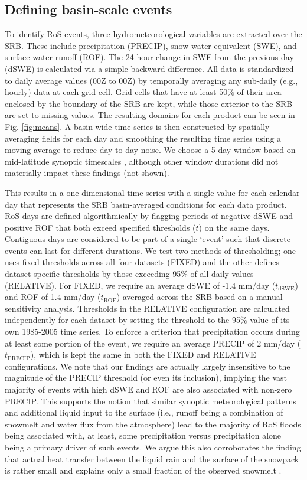 \documentclass[nhess, manuscript]{copernicus}
\begin{document}
\subsection{Defining basin-scale events}

To identify RoS events, three hydrometeorological variables are extracted over the SRB.
These include precipitation (PRECIP), snow water equivalent (SWE), and surface water runoff (ROF).
The 24-hour change in SWE from the previous day (dSWE) is calculated via a simple backward difference.
All data is standardized to daily average values (00Z to 00Z) by temporally averaging any sub-daily (e.g., hourly) data at each grid cell.
Grid cells that have at least 50\% of their area enclosed by the boundary of the SRB are kept, while those exterior to the SRB are set to missing values.
The resulting domains for each product can be seen in Fig. \ref{fig:means}. A basin-wide time series is then constructed by spatially averaging fields for each day and smoothing the resulting time series using a moving average to reduce day-to-day noise.
We choose a 5-day window based on mid-latitude synoptic timescales \citep{holton2004introduction}, although other window durations did not materially impact these findings (not shown).

This results in a one-dimensional time series with a single value for each calendar day that represents the SRB basin-averaged conditions for each data product.
RoS days are defined algorithmically by flagging periods of negative dSWE and positive ROF that both exceed specified thresholds ($t$) on the same days.
Contiguous days are considered to be part of a single `event' such that discrete events can last for different durations.
We test two methods of thresholding; one uses fixed thresholds across all four datasets (FIXED) and the other defines dataset-specific thresholds by those exceeding 95\% of all daily values (RELATIVE).
For FIXED, we require an average dSWE of -1.4 mm/day ($t_{\textrm{dSWE}}$) and ROF of 1.4 mm/day ($t_{\textrm{ROF}}$) averaged across the SRB based on a manual sensitivity analysis.
Thresholds in the RELATIVE configuration are calculated independently for each dataset by setting the threshold to the 95\% value of its own 1985-2005 time series.
To enforce a criterion that precipitation occurs during at least some portion of the event, we require an average PRECIP of 2 mm/day ($t_{\textrm{PRECIP}}$), which is kept the same in both the FIXED and RELATIVE configurations. We note that our findings are actually largely insensitive to the magnitude of the PRECIP threshold (or even its inclusion), implying the vast majority of events with high dSWE and ROF are also associated with non-zero PRECIP.
This supports the notion that similar synoptic meteorological patterns \citep{grote2021synoptic} and additional liquid input to the surface (i.e., runoff being a combination of snowmelt and water flux from the atmosphere) lead to the majority of RoS floods being associated with, at least, some precipitation versus precipitation alone being a primary driver of such events.
We argue this also corroborates the finding that actual heat transfer between the liquid rain and the surface of the snowpack is rather small and explains only a small fraction of the observed snowmelt \citep{moore1984controls}.
\end{document}
